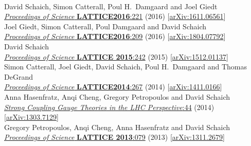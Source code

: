 \begin{spacelistout}
\begin{revnumerate}
    \pagebreakitem
       \\
      David Schaich, Simon Catterall, Poul H.~Damgaard and Joel Giedt \\
      \href{https://doi.org/10.22323/1.256.0221}{\textit{Proceedings of Science} \textbf{LATTICE2016}:221} (2016) [\href{http://arxiv.org/abs/1611.06561}{arXiv:1611.06561}]
    \pagebreakitem
       \\
      Joel Giedt, Simon Catterall, Poul Damgaard and David Schaich \\
      \href{https://doi.org/10.22323/1.256.0209}{\textit{Proceedings of Science} \textbf{LATTICE2016}:209} (2016) [\href{http://arxiv.org/abs/1804.07792}{arXiv:1804.07792}]
    \pagebreakitem
       \\
      David Schaich \\
      \href{https://doi.org/10.22323/1.251.0242}{\textit{Proceedings of Science} \textbf{LATTICE 2015}:242} (2015) [\href{http://arxiv.org/abs/1512.01137}{arXiv:1512.01137}]
    \pagebreakitem
       \\
      Simon Catterall, Joel Giedt, David Schaich, Poul H.~Damgaard and Thomas DeGrand \\
      \href{https://doi.org/10.22323/1.214.0267}{\textit{Proceedings of Science} \textbf{LATTICE2014}:267} (2014) [\href{http://arxiv.org/abs/1411.0166}{arXiv:1411.0166}]
    \pagebreakitem
       \\
      Anna Hasenfratz, Anqi Cheng, Gregory Petropoulos and David Schaich \\
      \href{http://dx.doi.org/10.1142/9789814566254_0004}{\textit{Strong Coupling Gauge Theories in the LHC Perspective}:44} (2014) [\href{http://arxiv.org/abs/1303.7129}{arXiv:1303.7129}]
    \pagebreakitem
       \\
      Gregory Petropoulos, Anqi Cheng, Anna Hasenfratz and David Schaich \\
      \href{https://doi.org/10.22323/1.187.0079}{\textit{Proceedings of Science} \textbf{LATTICE 2013}:079} (2013) [\href{http://arxiv.org/abs/1311.2679}{arXiv:1311.2679}]
    \pagebreakitem
       \\

\end{revnumerate}
\end{spacelistout}
